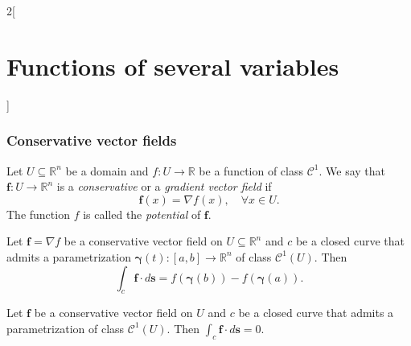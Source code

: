 \documentclass[../../../main.tex]{subfiles}
\begin{document}
\begin{multicols}{2}[\section{Functions of several variables}]
\subsubsection*{Conservative vector fields}
\begin{definition}
Let $U\subseteq\mathbb{R}^n$ be a domain and $f:U\rightarrow\mathbb{R}$ be a function of class $\mathcal{C}^1$. We say that $\boldsymbol{f}:U\rightarrow\mathbb{R}^n$ is a \textit{conservative} or a \textit{gradient vector field} if $$\boldsymbol{f}(x)=\nabla f(x),\quad \forall x\in U.$$ The function $f$ is called the \textit{potential} of $\boldsymbol{f}$.
\end{definition}
\begin{theorem}
Let $\boldsymbol{f}=\nabla f$ be a conservative vector field on $U\subseteq\mathbb{R}^n$ and $c$ be a closed curve that admits a parametrization $\boldsymbol{\gamma}(t):[a,b]\rightarrow\mathbb{R}^n$ of class $\mathcal{C}^1(U)$. Then $$\int_c\boldsymbol{f}\cdot d\textbf{s}=f(\boldsymbol{\gamma}(b))-f(\boldsymbol{\gamma}(a)).$$
\end{theorem}
\begin{corollary}
Let $\boldsymbol{f}$ be a conservative vector field on $U$ and $c$ be a closed curve that admits a parametrization of class $\mathcal{C}^1(U)$. Then $\displaystyle\int_c\boldsymbol{f}\cdot d\textbf{s}=0$.
\end{corollary}

\end{multicols}
\end{document}
